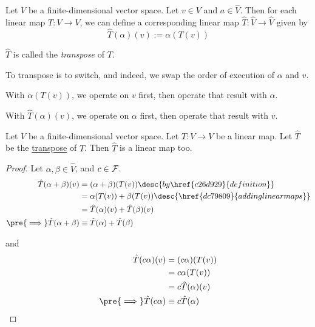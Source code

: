 \label{c26d929}

Let $V$ be a finite-dimensional vector space. Let $v\in V$ and $a\in\hat V$.
Then for each linear map $T:V\to V$, we can define a corresponding linear map
$\hat T:\hat V\to\hat V$ given by
$$
  \hat T(\alpha)(v):=\alpha(T(v))
$$

$\hat T$ is called the \textit{transpose} of $T$.

To transpose is to switch, and indeed, we swap the order of execution of
$\alpha$ and $v$.
\begin{enumerati}
  \item With $\alpha(T(v))$, we operate on $v$ first, then operate that result
        with $\alpha$.
  \item With $\hat T(\alpha)(v)$, we operate on $\alpha$ first, then operate
        that result with $v$.
\end{enumerati}

\label{bb62764}

Let $V$ be a finite-dimensional vector space. Let $T:V\to V$ be a linear map.
Let $\hat T$ be the \href{c26d929}{transpose} of $T$. Then $\hat T$ is a linear
map too.

\begin{proof}
  Let $\alpha,\beta\in\hat V$, and $c\in\mathcal F$.
  \begin{align*}
    \hat T(\alpha+\beta)(v)            &=(\alpha+\beta)(T(v))\desc{by \href{c26d929}{definition}}          \\
                                       &=\alpha(T(v))+\beta(T(v))\desc{\href{dc79809}{adding linear maps}} \\
                                       &=\hat T(\alpha)(v)+\hat T(\beta)(v)                                \\
    \pre{\implies}\hat T(\alpha+\beta) &\equiv\hat T(\alpha)+\hat T(\beta)
  \end{align*}

  and
  \begin{align*}
    \hat T(c\alpha)(v)            &=(c\alpha)(T(v))       \\
                                  &=c\alpha(T(v))         \\
                                  &=c\hat T(\alpha)(v)    \\
    \pre{\implies}\hat T(c\alpha) &\equiv c\hat T(\alpha)
  \end{align*}
\end{proof}
